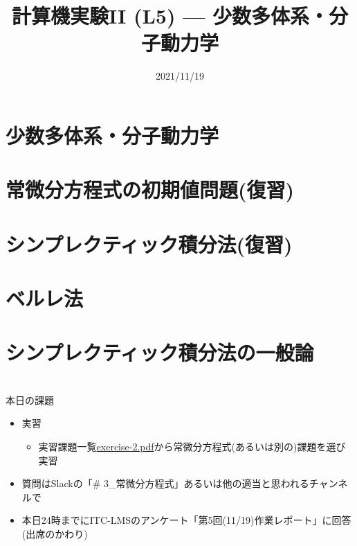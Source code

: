 \documentclass[10pt,dvipdfmx]{beamer}
\title{計算機実験II (L5) --- 少数多体系・分子動力学}
\date{2021/11/19}
\begin{document}
\begin{frame}
  \titlepage
  \tableofcontents
\end{frame}



\section{少数多体系・分子動力学}






\section{常微分方程式の初期値問題(復習)}
% 




\section{シンプレクティック積分法(復習)}





\section{ベルレ法}




\section{シンプレクティック積分法の一般論}






\section{}
\begin{frame}[t]{本日の課題}
  \begin{itemize}
  \item 実習
    \begin{itemize}
    \item 実習課題一覧\href{https://github.com/todo-group/ComputerExperiments/releases/tag/2021a-computer2}{exercise-2.pdf}から常微分方程式(あるいは別の)課題を選び実習
    \end{itemize}
  \item 質問はSlackの「\# 3\_常微分方程式」あるいは他の適当と思われるチャンネルで
  \item 本日24時までにITC-LMSのアンケート「第5回(11/19)作業レポート」に回答(出席のかわり)
  \end{itemize}
\end{frame}
\end{document}
